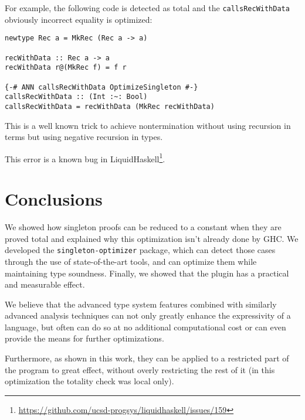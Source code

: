 For example, the following code is detected as total and the \texttt{callsRecWithData} obviously incorrect equality is optimized:

\begin{lstlisting}
newtype Rec a = MkRec (Rec a -> a)

recWithData :: Rec a -> a
recWithData r@(MkRec f) = f r

{-# ANN callsRecWithData OptimizeSingleton #-}
callsRecWithData :: (Int :~: Bool)
callsRecWithData = recWithData (MkRec recWithData)
\end{lstlisting}

This is a well known trick to achieve nontermination without using recursion in terms but using negative recursion in types.

This error is a known bug in LiquidHaskell\footnote{\url{https://github.com/ucsd-progsys/liquidhaskell/issues/159}}.

\chapter{Conclusions}
\label{cha:conclusions}

We showed how singleton proofs can be reduced to a constant when they are proved total and explained why this optimization isn't already done by GHC.
We developed the \texttt{singleton-optimizer} package, which can detect those cases through the use of state-of-the-art tools, and can optimize them while maintaining type soundness.
Finally, we showed that the plugin has a practical and measurable effect.

We believe that the advanced type system features combined with similarly advanced analysis techniques can not only greatly enhance the expressivity of a language, but often can do so at no additional computational cost or can even provide the means for further optimizations.

Furthermore, as shown in this work, they can be applied to a restricted part of the program to great effect, without overly restricting the rest of it (in this optimization the totality check was local only).

